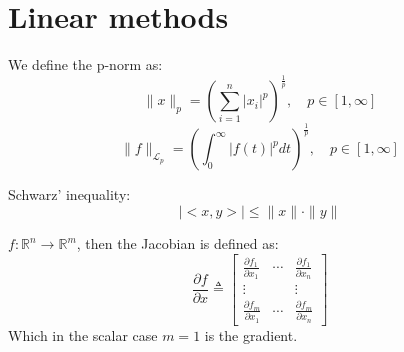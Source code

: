 \appendix

\section{Linear methods}
\begin{definition}
    We define the p-norm as:
    \begin{equation}
    \|x\|_{p}=\left(\sum_{i=1}^{n}\left|x_{i}\right|^{p}\right)^{\frac{1}{p}}, \quad p \in[1, \infty]
    \end{equation}
    \begin{equation}
        \|f\|_{\mathscr{L}_{p}}=\left(\int_{0}^{\infty}|f(t)|^{p} d t\right)^{\frac{1}{p}}, \quad p \in[1, \infty]
    \end{equation}
\end{definition}
\begin{theorem}
    Schwarz' inequality:
    \begin{equation}
        |<x, y>| \leq\|x\| \cdot\|y\|
    \end{equation}
\end{theorem}
\begin{definition}
    $f: \mathbb{R}^{n} \rightarrow \mathbb{R}^{m}$, then the Jacobian is defined as:
    \begin{equation}
    \frac{\partial f}{\partial x} \triangleq\left[\begin{array}{ccc}{\frac{\partial f_{1}}{\partial x_{1}}} & {\cdots} & {\frac{\partial f_{1}}{\partial x_{n}}} \\ {\vdots} & {} & {\vdots} \\ {\frac{\partial f_{m}}{\partial x_{1}}} & {\cdots} & {\frac{\partial f_{m}}{\partial x_{n}}}\end{array}\right]
    \end{equation}
    Which in the scalar case $m=1$ is the gradient.
\end{definition}